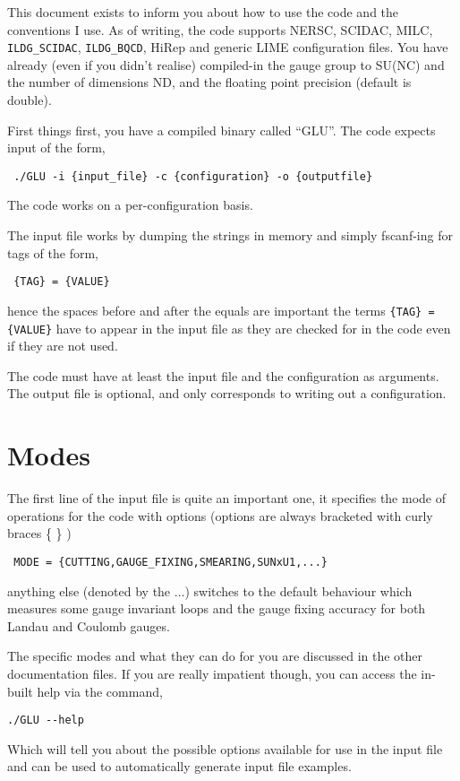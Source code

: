 \documentclass[12pt]{article}
\begin{document}
This document exists to inform you about how to use the code and the conventions I use. As of writing, the code supports NERSC, SCIDAC, MILC, \verb|ILDG_SCIDAC|, \verb|ILDG_BQCD|, HiRep and generic LIME configuration files. You have already (even if you didn't realise) compiled-in the gauge group to SU(NC) and the number of dimensions ND, and the floating point precision (default is double).

First things first, you have a compiled binary called ``GLU''. The code expects input of the form,
\begin{verbatim}
 ./GLU -i {input_file} -c {configuration} -o {outputfile}
\end{verbatim}
The code works on a per-configuration basis.

The input file works by dumping the strings in memory and simply fscanf-ing for tags of the form,
\begin{verbatim}
 {TAG} = {VALUE}
\end{verbatim}
hence the spaces before and after the equals are important the terms \verb|{TAG} = {VALUE}| have to appear in the input file as they are checked for in the code even if they are not used.

The code must have at least the input file and the configuration as arguments. The output file is optional, and only corresponds to writing out a configuration.

\section{Modes}

The first line of the input file is quite an important one, it specifies the mode of operations for the code with options (options are always bracketed with curly braces \{ \} )
\begin{verbatim}
 MODE = {CUTTING,GAUGE_FIXING,SMEARING,SUNxU1,...}
\end{verbatim}
anything else (denoted by the ...) switches to the default behaviour which measures some gauge invariant loops and the gauge fixing accuracy for both Landau and Coulomb gauges.

The specific modes and what they can do for you are discussed in the other documentation files. If you are really impatient though, you can access the in-built help via the command,
\begin{verbatim}
./GLU --help
\end{verbatim}
Which will tell you about the possible options available for use in the input file and can be used to automatically generate input file examples.
\end{document}
